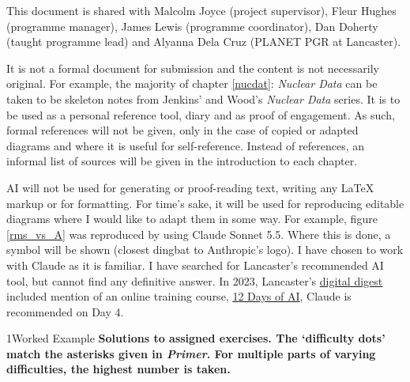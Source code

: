 \newpage
{}

This document is shared with Malcolm Joyce (project supervisor), Fleur Hughes (programme manager), James Lewis (programme coordinator), Dan Doherty (taught programme lead) and Alyanna Dela Cruz (PLANET PGR at Lancaster). 

It is not a formal document for submission and the content is not necessarily original. For example, the majority of chapter \ref{nucdat}: \textit{Nuclear Data} can be taken to be skeleton notes from Jenkins' and Wood's \textit{Nuclear Data} series. It is to be used as a personal reference tool, diary and as proof of engagement. As such, formal references will not be given, only in the case of copied or adapted diagrams and where it is useful for self-reference. Instead of references, an informal list of sources will be given in the introduction to each chapter. 

AI will not be used for generating or proof-reading text, writing any LaTeX markup or for formatting. For time's sake, it will be used for reproducing editable diagrams where I would like to adapt them in some way. For example, figure \ref{rms_vs_A} was reproduced by using Claude Sonnet 5.5. Where this is done, a \anth symbol will be shown (closest dingbat to Anthropic's logo). I have chosen to work with Claude as it is familiar. I have searched for Lancaster's recommended AI tool, but cannot find any definitive answer. In 2023, Lancaster's \href{https://wp.lancs.ac.uk/lu-digitaldigest/2023/12/01/ai-tools-a-christmassy-showcase/}{\ul{digital digest}} included mention of an online training course, \href{https://12daysofai.myblog.arts.ac.uk/daily-activities/}{\ul{12 Days of AI}}, Claude is recommended on Day 4.

\begin{example}{1}{Worked Example}
\textbf{Solutions to assigned exercises. The `difficulty dots' match the asterisks given in \textit{Primer}. For multiple parts of varying difficulties, the highest number is taken.}
\end{example}







\vfill
